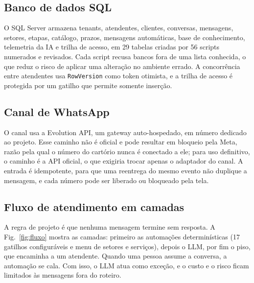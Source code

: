 \documentclass[conference]{IEEEtran}
\begin{document}
\subsection{Banco de dados SQL}

O SQL Server armazena tenants, atendentes, clientes, conversas, mensagens, setores, etapas, catálogo, prazos, mensagens automáticas, base de conhecimento, telemetria da IA e trilha de acesso, em 29 tabelas criadas por 56 scripts numerados e revisados. Cada script recusa bancos fora de uma lista conhecida, o que reduz o risco de aplicar uma alteração no ambiente errado. A concorrência entre atendentes usa \texttt{RowVersion} como token otimista, e a trilha de acesso é protegida por um gatilho que permite somente inserção.

\subsection{Canal de WhatsApp}

O canal usa a Evolution API, um gateway auto-hospedado, em número dedicado ao projeto. Esse caminho não é oficial e pode resultar em bloqueio pela Meta, razão pela qual o número do cartório nunca é conectado a ele; para uso definitivo, o caminho é a API oficial, o que exigiria trocar apenas o adaptador do canal. A entrada é idempotente, para que uma reentrega do mesmo evento não duplique a mensagem, e cada número pode ser liberado ou bloqueado pela tela.

\subsection{Fluxo de atendimento em camadas}

A regra de projeto é que nenhuma mensagem termine sem resposta. A Fig.~\ref{fig:fluxo} mostra as camadas: primeiro as automações determinísticas (17 gatilhos configuráveis e menu de setores e serviços), depois o LLM, por fim o piso, que encaminha a um atendente. Quando uma pessoa assume a conversa, a automação se cala. Com isso, o LLM atua como exceção, e o custo e o risco ficam limitados às mensagens fora do roteiro.
\end{document}
